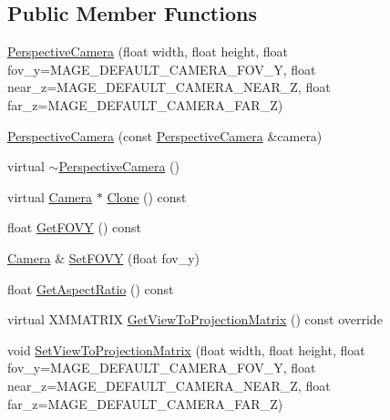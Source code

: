 \subsection*{Public Member Functions}
\begin{DoxyCompactItemize}
\item 
\hyperlink{classmage_1_1_perspective_camera_aef3998fca25cb7d99b9a03ef9483040d}{Perspective\+Camera} (float width, float height, float fov\+\_\+y=M\+A\+G\+E\+\_\+\+D\+E\+F\+A\+U\+L\+T\+\_\+\+C\+A\+M\+E\+R\+A\+\_\+\+F\+O\+V\+\_\+Y, float near\+\_\+z=M\+A\+G\+E\+\_\+\+D\+E\+F\+A\+U\+L\+T\+\_\+\+C\+A\+M\+E\+R\+A\+\_\+\+N\+E\+A\+R\+\_\+Z, float far\+\_\+z=M\+A\+G\+E\+\_\+\+D\+E\+F\+A\+U\+L\+T\+\_\+\+C\+A\+M\+E\+R\+A\+\_\+\+F\+A\+R\+\_\+Z)
\item 
\hyperlink{classmage_1_1_perspective_camera_a198d1460d9312af27ed6ef2ac28b616d}{Perspective\+Camera} (const \hyperlink{classmage_1_1_perspective_camera}{Perspective\+Camera} \&camera)
\item 
virtual \hyperlink{classmage_1_1_perspective_camera_abf42546e2560d7d62e7e62680a6da02b}{$\sim$\+Perspective\+Camera} ()
\item 
virtual \hyperlink{classmage_1_1_camera}{Camera} $\ast$ \hyperlink{classmage_1_1_perspective_camera_aa2fae7b2ca5daadeda0fd935fcdb101a}{Clone} () const
\item 
float \hyperlink{classmage_1_1_perspective_camera_a15223034b30ca691c51de8850c033293}{Get\+F\+O\+VY} () const
\item 
\hyperlink{classmage_1_1_camera}{Camera} \& \hyperlink{classmage_1_1_perspective_camera_a00033fc6b25206c40a056ce142fecfee}{Set\+F\+O\+VY} (float fov\+\_\+y)
\item 
float \hyperlink{classmage_1_1_perspective_camera_ab74cbd2777d5b430da5702a12b1b451e}{Get\+Aspect\+Ratio} () const
\item 
virtual X\+M\+M\+A\+T\+R\+IX \hyperlink{classmage_1_1_perspective_camera_a83a38a4e8180707df2323130f9cee4a5}{Get\+View\+To\+Projection\+Matrix} () const override
\item 
void \hyperlink{classmage_1_1_perspective_camera_adef65223ab45c65cebf712dd14cea942}{Set\+View\+To\+Projection\+Matrix} (float width, float height, float fov\+\_\+y=M\+A\+G\+E\+\_\+\+D\+E\+F\+A\+U\+L\+T\+\_\+\+C\+A\+M\+E\+R\+A\+\_\+\+F\+O\+V\+\_\+Y, float near\+\_\+z=M\+A\+G\+E\+\_\+\+D\+E\+F\+A\+U\+L\+T\+\_\+\+C\+A\+M\+E\+R\+A\+\_\+\+N\+E\+A\+R\+\_\+Z, float far\+\_\+z=M\+A\+G\+E\+\_\+\+D\+E\+F\+A\+U\+L\+T\+\_\+\+C\+A\+M\+E\+R\+A\+\_\+\+F\+A\+R\+\_\+Z)
\end{DoxyCompactItemize}
